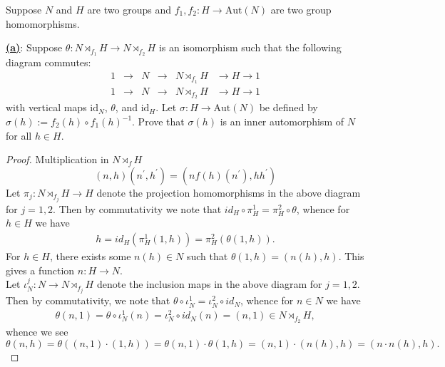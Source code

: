 \documentclass[12pt]{article}
\begin{document}
\begin{homeworkProblem}
  Suppose $N$ and $H$ are two groups and $f_1, f_2 : H \to \mathrm{Aut}(N)$ are two group homomorphisms.

  \underline{\textbf{(a)}}: Suppose $\theta : N \rtimes_{f_1} H \to N \rtimes_{f_2} H$ is an isomorphism such that the following diagram commutes:
  \[
  \begin{array}{cccccc}
  1 & \to & N & \to & N \rtimes_{f_1} H & \to H \to 1 \\
  1 & \to & N & \to & N \rtimes_{f_2} H & \to H \to 1
  \end{array}
  \]
  with vertical maps $\mathrm{id}_N$, $\theta$, and $\mathrm{id}_H$.  
  Let $\sigma : H \to \mathrm{Aut}(N)$ be defined by $\sigma(h) := f_2(h) \circ f_1(h)^{-1}$.  
  Prove that $\sigma(h)$ is an inner automorphism of $N$ for all $h \in H$.\\

  \begin{proof}
    Multiplication in $ N\rtimes_{f} H $
    \[
      (n, h)(n^{\prime}, h^{\prime}) = (n f(h)(n^{\prime}), h h^{\prime})
    \]
    Let $ \pi_{j}:N\rtimes_{f_{j}}H\to H $ denote the projection homomorphisms in the above diagram for $ j=1,2 $. Then by commutativity we note that $id_{H}\circ \pi^{1}_{H} = \pi^{2}_{H}\circ \theta$, whence for $ h\in H $ we have 
    \begin{align*}
      h = id_H(\pi^{1}_{H}(1,h)) = \pi^{2}_{H}(\theta(1,h)).
    \end{align*} 
    For $ h\in H $, there exists some $ n(h)\in N $ such that $ \theta(1,h) = (n(h),h) $. This gives a function $ n:H\to N $.\\

    Let $ \iota^{j}_{N}:N\to N\rtimes_{f_{j}}H  $ denote the inclusion maps in the above diagram for $ j=1,2 $. Then by commutativity, we note that $ \theta\circ \iota^{1}_{N} = \iota^{2}_{N}\circ id_{N} $, whence for $ n\in N $ we have 
    \begin{align*}
      \theta(n,1) = \theta\circ\iota^{1}_{N}(n) = \iota_{N}^{2}\circ id_{N}(n) = (n,1) \in N\rtimes_{f_{2}}H,
    \end{align*}
    whence we see
    \[
      \theta(n,h) = \theta((n,1)\cdot(1,h)) = \theta(n,1) \cdot \theta(1,h) = (n,1)\cdot (n(h),h) = (n\cdot n(h), h).
    \]


\end{proof}
\end{homeworkProblem}
\end{document}
